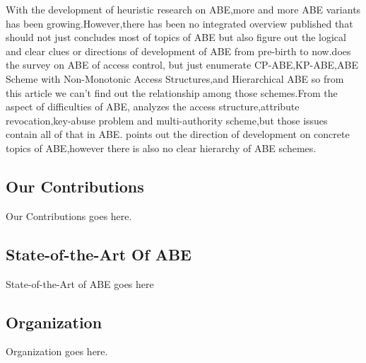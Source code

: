 With the development of heuristic research on ABE,more and more ABE variants has been growing.However,there has been no integrated overview published that should not just concludes most of topics of ABE but also figure out the logical and clear clues or directions of development of ABE from pre-birth to now.\cite{IE:survey}does the survey on ABE of access control,%
but just enumerate CP-ABE,KP-ABE,ABE Scheme with Non-Monotonic Access Structures,and Hierarchical ABE so from this article we can't find out the relationship among those schemes.From the aspect of difficulties of ABE,\cite{Su:survey}
analyzes the access structure,attribute revocation,key-abuse problem and multi-authority scheme,but those issues contain all of that in ABE.\cite{Feng:survey} points out the direction of development on concrete topics of ABE,however there is also no clear hierarchy of ABE schemes.
\subsection{Our Contributions}
Our Contributions goes here.
\subsection{State-of-the-Art Of ABE}
State-of-the-Art of ABE goes here
\subsection{Organization}
Organization goes here.
